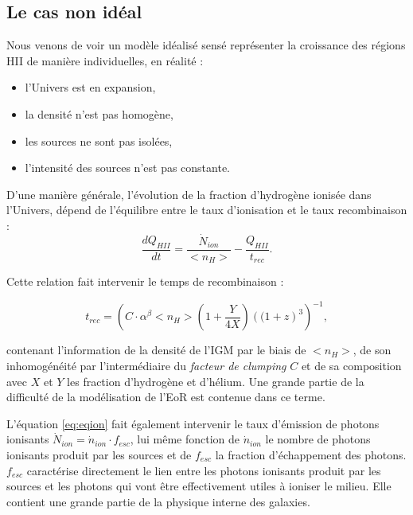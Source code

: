 \subsection{Le cas non idéal}

Nous venons de voir un modèle idéalisé sensé représenter la croissance des régions HII de manière individuelles, en réalité : 
\begin{itemize}
\item l'Univers est en expansion,
\item la densité n'est pas homogène,%
\item les sources ne sont pas isolées,
\item l'intensité des sources n'est pas constante. %
\end{itemize}

D'une manière générale, l'évolution de la fraction d'hydrogène ionisée dans l'Univers, dépend de l'équilibre entre le taux d'ionisation et le taux recombinaison \citep{0004-637X-514-2-648, RevModPhys.81.1405} :
\begin{equation}
\frac{dQ_{HII}}{dt} = \frac{\dot{N}_{ion}}{ <n_H>} - \frac{Q_{HII}}{t_{rec}}.
\label{eq:eqion}
\end{equation}

Cette relation fait intervenir le temps de recombinaison :

\begin{equation}
t_{rec} = \left( C\cdot \alpha^\beta <n_H> \left( 1+\frac{Y}{4X}\right) \left((1+z\right)^3  \right)^{-1}, 
\end{equation}

contenant l'information de la densité de l'\ac{IGM} par le biais de $<n_H>$, de son inhomogénéité par l'intermédiaire du \textit{facteur de clumping} $C$ et de sa composition avec $X$ et $Y$ les fraction d'hydrogène et d'hélium.
Une grande partie de la difficulté de la modélisation de l'\ac{EoR} est contenue dans ce terme.

L'équation \ref{eq:eqion} fait également intervenir le taux d'émission de photons ionisants $\dot{N}_{ion}= \dot{n}_{ion} \cdot f_{esc}$, lui même fonction de $\dot{n}_{ion}$ le nombre de photons ionisants produit par les sources et de $f_{esc}$ la fraction d'échappement des photons. 
$f_{esc}$ caractérise directement le lien entre les photons ionisants produit par les sources et les photons qui vont être effectivement utiles à ioniser le milieu.
Elle contient une grande partie de la physique interne des galaxies.


